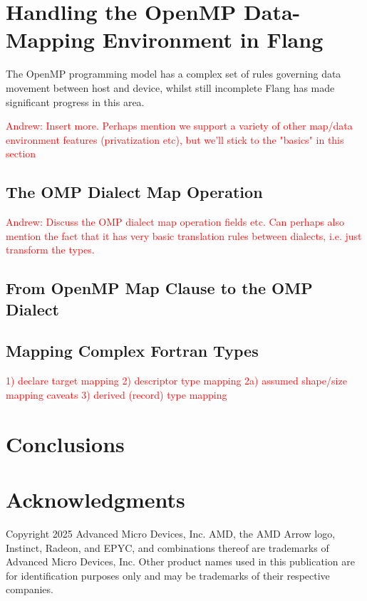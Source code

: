 \documentclass[acmtog,natbib=false]{acmart}
\newcommand{\todo}[1]{\textcolor{red}{#1}}
\begin{document}
\section{Handling the OpenMP Data-Mapping Environment in Flang}

The OpenMP programming model has a complex set of rules governing data movement between host and device, whilst still incomplete Flang has made significant progress in this area.

\todo{Andrew: Insert more. Perhaps mention we support a variety of other map/data environment features (privatization etc), but we'll stick to the "basics" in this section} 

\subsection{The OMP Dialect Map Operation}

\todo{Andrew: Discuss the OMP dialect map operation fields etc. Can perhaps also mention the fact that it has very basic translation rules between dialects, i.e. just transform the types.}

\subsection{From OpenMP Map Clause to the OMP Dialect}

\subsection{Mapping Complex Fortran Types}

\todo{1) declare target mapping 2) descriptor type mapping 2a) assumed shape/size mapping caveats 3) derived (record) type mapping}


\section{Conclusions}
\label{sec:Conclusions}





\section*{Acknowledgments}
Copyright 2025 Advanced Micro Devices, Inc.
AMD, the AMD Arrow logo, Instinct, Radeon, and EPYC, and combinations thereof are trademarks of Advanced Micro Devices, Inc.
Other product names used in this publication are for identification purposes only and may be trademarks of their respective companies.

\printbibliography
\end{document}
